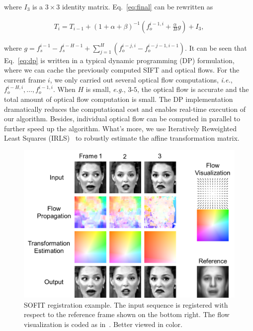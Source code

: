 \documentclass[10pt,journal]{IEEEtran}
\begin{document}
\noindent where $I_3$ is a $3\times 3$ identity matrix. Eq.~\eqref{eq:final} can be rewritten as

\begin{align}
\label{eq:dp}
T_i=T_{i-1}+(1+\alpha+\beta)^{-1}(f_o^{i-1,i}+\frac{\alpha}{H}g) + I_3,
\end{align}

\noindent where $g=f_s^{i-1}-f_s^{i-H-1}+\sum_{j=1}^H(f_o^{i-j,i}-f_o^{i-j-1,i-1})$. It can be seen that Eq.~\eqref{eq:dp} is written in a typical dynamic programming (DP) formulation, where we can cache the previously computed SIFT and optical flows. For the current frame $i$, we only carried out several optical flow computations, \textit{i.e.}, $f_o^{i-H,i},\ldots,f_o^{i-1,i}$. When $H$ is small, \textit{e.g.}, $3$-$5$, the optical flow is accurate and the total amount of optical flow computation is small. The DP implementation dramatically reduces the computational cost and enables real-time execution of our algorithm. Besides, individual optical flow can be computed in parallel to further speed up the algorithm. What's more, we use Iteratively Reweighted Least Squares (IRLS)~\cite{Huber81} to robustly estimate the affine transformation matrix. 

\begin{figure}[htbp]
	\centering
		\includegraphics[width=\columnwidth]{fig/theory_example.png}
	\caption{SOFIT registration example. The input sequence is registered with respect to the reference frame shown on the bottom right. The flow visualization is coded as in~\cite{Baker_ICCV07}. Better viewed in color.}
	\label{fig_theory_example}
\end{figure}
\end{document}
